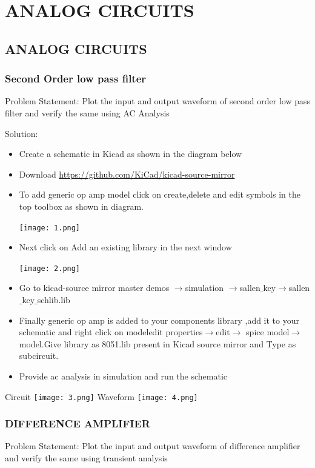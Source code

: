 \documentclass[12pt,a4paper]{  report}
\begin{document}
\chapter{\textbf{ANALOG CIRCUITS}}
\section{ANALOG CIRCUITS}
\subsection{Second Order low pass filter}
Problem Statement:
Plot the input and output waveform of second order low pass filter and verify the same using AC Analysis

Solution:
\begin{itemize}
\item Create a schematic in Kicad as shown in the diagram below
\item Download \url{https://github.com/KiCad/kicad-source-mirror}
\item To add generic op amp model click on  create,delete and edit symbols in the top toolbox as shown in diagram.
\begin{flushleft}
\texttt{[image: 1.png]}
\end{flushleft}
\newpage
\item  Next click on Add an existing library in the next window
\begin{flushleft}
\texttt{[image: 2.png]}
\end{flushleft}
\item Go to kicad-source mirror master   demos  $\rightarrow$simulation $\rightarrow$sallen$\_$key$\rightarrow$sallen$\_$key$\_$schlib.lib
\item Finally generic op amp is added to your components library ,add it to your schematic and right click on modeledit properties$\rightarrow$edit$\rightarrow$ spice model$\rightarrow$model.Give library as 8051.lib present in Kicad source mirror and Type as subcircuit.
\item Provide ac analysis in simulation and run the schematic
\end{itemize}
Circuit
\texttt{[image: 3.png]}
\newpage
Waveform
\texttt{[image: 4.png]}
\subsection{DIFFERENCE AMPLIFIER}
Problem Statement:
Plot  the input and output waveform of difference amplifier and verify the same using transient analysis
\end{document}

